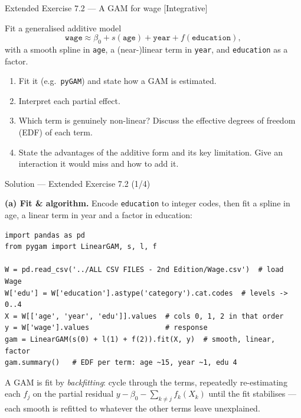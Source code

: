 \documentclass[aspectratio=169,11pt]{beamer}
\begin{document}
\begin{frame}{Extended Exercise 7.2 --- A GAM for wage [Integrative]}
\begin{longexercise}
Fit a generalised additive model
\[ \mathtt{wage} \approx \beta_0 + s(\mathtt{age}) + \mathtt{year} + f(\mathtt{education}), \]
with a smooth spline in \texttt{age}, a (near-)linear term in \texttt{year}, and \texttt{education} as a factor.
\begin{enumerate}
  \item Fit it (e.g.\ \texttt{pyGAM}) and state how a GAM is estimated.
  \item Interpret each partial effect.
  \item Which term is genuinely non-linear? Discuss the effective degrees of freedom (EDF) of each term.
  \item State the advantages of the additive form and its key limitation. Give an interaction it would miss and how to add it.
\end{enumerate}
\end{longexercise}
\end{frame}

\begin{frame}[fragile]{Solution --- Extended Exercise 7.2 (1/4)}
\begin{solutionbox}
\textbf{(a) Fit \& algorithm.} Encode \texttt{education} to integer codes, then fit a spline in age, a linear term in year and a factor in education:
\begin{lstlisting}
import pandas as pd
from pygam import LinearGAM, s, l, f

W = pd.read_csv('../ALL CSV FILES - 2nd Edition/Wage.csv')  # load Wage
W['edu'] = W['education'].astype('category').cat.codes  # levels -> 0..4
X = W[['age', 'year', 'edu']].values  # cols 0, 1, 2 in that order
y = W['wage'].values                  # response
gam = LinearGAM(s(0) + l(1) + f(2)).fit(X, y)  # smooth, linear, factor
gam.summary()   # EDF per term: age ~15, year ~1, edu 4
\end{lstlisting}
A GAM is fit by \emph{backfitting}: cycle through the terms, repeatedly re-estimating each $f_j$ on the partial residual $y-\beta_0-\sum_{k\neq j}f_k(X_k)$ until the fit stabilises --- each smooth is refitted to whatever the other terms leave unexplained.
\end{solutionbox}
\end{frame}
\end{document}
